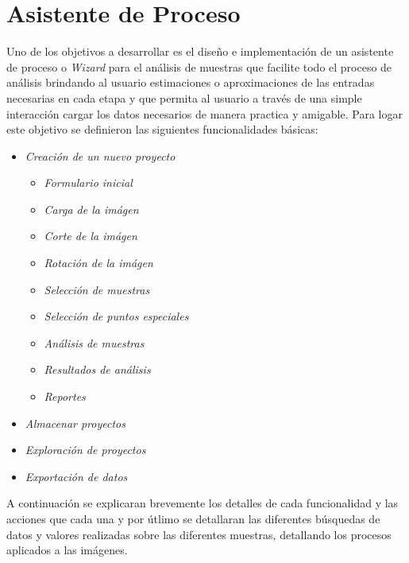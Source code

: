\section{Asistente de Proceso}
Uno de los objetivos a desarrollar es el dise\~no e implementaci\'on de un asistente de proceso o \textit{Wizard} para el an\'alisis de muestras que facilite todo el proceso de an\'alisis brindando al usuario estimaciones o aproximaciones de las entradas necesarias en cada etapa y que permita al usuario a trav\'es de una simple interacci\'on cargar los datos necesarios de manera practica y amigable. Para logar este objetivo se definieron las siguientes funcionalidades básicas:
\begin{itemize}
	\renewcommand{\labelitemi}{$\bullet$}
	\renewcommand{\labelitemii}{$\circ$}
	\item \textit{Creaci\'on de un nuevo proyecto}
	\begin{itemize}
		\item \textit{Formulario inicial}
		\item \textit{Carga de la im\'agen}
		\item \textit{Corte de la im\'agen}
		\item \textit{Rotaci\'on de la im\'agen}
		\item \textit{Selecci\'on de muestras}
		\item \textit{Selecci\'on de puntos especiales}
		\item \textit{An\'alisis de muestras}
		\item \textit{Resultados de an\'alisis}
		\item \textit{Reportes}
	\end{itemize}
	\item \textit{Almacenar proyectos}
	\item \textit{Exploraci\'on de proyectos}
	\item \textit{Exportaci\'on de datos}
\end{itemize}
A continuaci\'on se explicaran brevemente los detalles de cada funcionalidad y las acciones que cada una y por \'utlimo se detallaran las diferentes b\'usquedas de datos y valores realizadas sobre las diferentes muestras, detallando los procesos aplicados a las im\'agenes.

